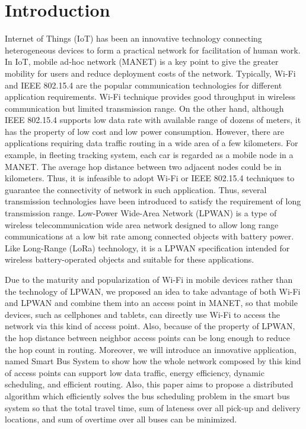 \documentclass[runningheads]{llncs}
\begin{document}
\section{Introduction}
Internet of Things (IoT) has been an innovative technology connecting heterogeneous devices to form a practical network for facilitation of human work. In IoT, mobile ad‐hoc network (MANET) is a key point to give the greater mobility for users and reduce deployment costs of the network. Typically, Wi-Fi and IEEE 802.15.4 are the popular communication technologies for different application requirements. Wi-Fi technique provides good throughput in wireless communication but limited transmission range. On the other hand, although IEEE 802.15.4 supports low data rate with available range of dozens of meters, it has the property of low cost and low power consumption. However, there are applications requiring data traffic routing in a wide area of a few kilometers. For example, in fleeting tracking system, each car is regarded as a mobile node in a MANET. The average hop distance between two adjacent nodes could be in kilometers. Thus, it is infeasible to adopt Wi-Fi or IEEE 802.15.4 techniques to guarantee the connectivity of network in such application. Thus, several transmission technologies have been introduced to satisfy the requirement of long transmission range. Low-Power Wide-Area Network (LPWAN) is a type of wireless telecommunication wide area network designed to allow long range communications at a low bit rate among connected objects with battery power. Like Long-Range (LoRa) technology, it is a LPWAN specification intended for wireless battery-operated objects and suitable for these applications.

Due to the maturity and popularization of Wi-Fi in mobile devices rather than the technology of LPWAN, we proposed an idea to take advantage of both Wi-Fi and LPWAN and combine them into an access point in MANET, so that mobile devices, such as cellphones and tablets, can directly use Wi-Fi to access the network via this kind of access point. Also, because of the property of LPWAN, the hop distance between neighbor access points can be long enough to reduce the hop count in routing. Moreover, we will introduce an innovative application, named Smart Bus System to show how the whole network composed by this kind of access points can support low data traffic, energy efficiency, dynamic scheduling, and efficient routing. Also, this paper aims to propose a distributed algorithm which efficiently solves the bus scheduling problem in the smart bus system so that the total travel time, sum of lateness over all pick-up and delivery locations, and sum of overtime over all buses can be minimized.
\end{document}
